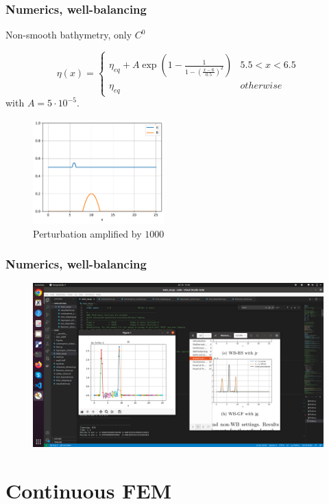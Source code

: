 \documentclass[pt12]{beamer}
\begin{document}
\begin{frame}
\frametitle{Numerics, well-balancing}
Non-smooth bathymetry, only $C^0$

$$\eta(x)=\begin{cases}
\eta_{eq}+A\exp{\left(1-\frac{1}{1-\left(\frac{x-6}{0.5}\right)^2}\right)} & 5.5<x<6.5\\
\eta_{eq} & otherwise
\end{cases}$$
with $A=5\cdot 10^{-5}$.

\begin{figure}
         \centering
         \includegraphics[width=0.45\textwidth]{figures/lakeatrest/alb_latr_pert_IC.pdf}
         \caption{Perturbation amplified by $1000$}
\end{figure}


\end{frame}

\begin{frame}
\frametitle{Numerics, well-balancing}


\begin{figure}
         \centering
         \includegraphics[width=1.2\textwidth]{figures/lakeatrest/perturbation.png}
\end{figure}


\end{frame}

\section{Continuous FEM}
\frame\sectionpage
\end{document}

